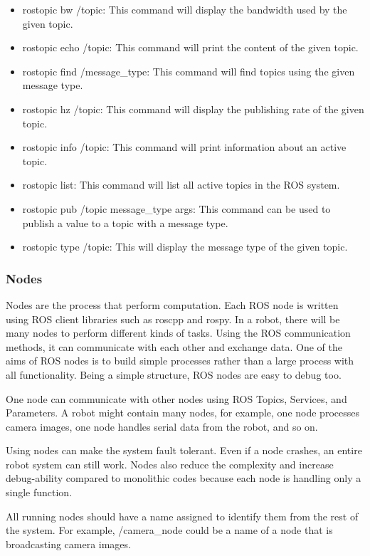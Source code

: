  	\begin{itemize}
 		\item rostopic bw /topic: This command will display the bandwidth used by the given topic.
 		\item rostopic echo /topic: This command will print the content of the given topic. 
 		\item rostopic find /message\_type: This command will find topics using the given message type. 
 		\item rostopic hz /topic: This command will display the publishing rate of the given topic. 
 		\item rostopic info /topic: This command will print information about an active topic. 
 		\item rostopic list: This command will list all active topics in the ROS system. 
 		\item rostopic pub /topic message\_type args: This command can be used to publish a value to a topic with a message type.
 		\item rostopic type /topic: This will display the message type of the given topic.
 	\end{itemize}
 
 	\subsubsection{Nodes}
 	Nodes are the process that perform computation. Each ROS node is written using ROS client libraries such as roscpp and rospy. In a robot, there will be many nodes to perform different kinds of tasks. Using the ROS communication methods, it can communicate with each other and exchange data. One of the aims of ROS nodes is to build simple processes rather than a large process with all functionality. Being a simple structure, ROS nodes are easy to debug too.
 	
 	One node can communicate with other nodes using ROS Topics, Services, and Parameters. A robot might contain many nodes, for example, one node processes camera images, one node handles serial data from the robot, and so on.
 	
 	Using nodes can make the system fault tolerant. Even if a node crashes, an entire robot system can still work. Nodes also reduce the complexity and increase debug-ability compared to monolithic codes because each node is handling only a single function.
 	
 	All running nodes should have a name assigned to identify them from the rest of the system. For example, /camera\_node could be a name of a node that is broadcasting camera
 	images.
 	
